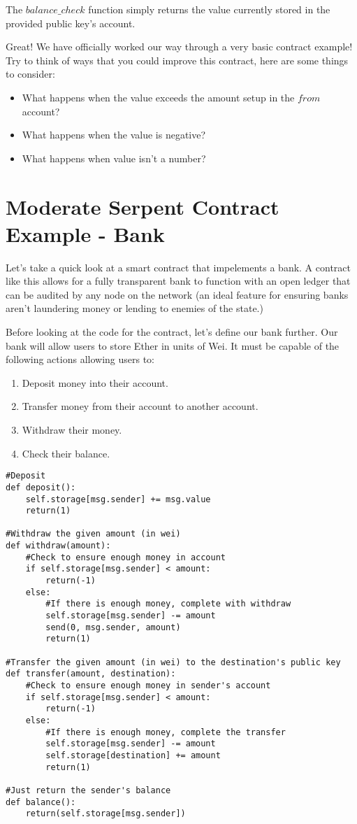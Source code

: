 \documentclass[12pt]{article}
\begin{document}
The $balance\_check$ function simply returns the value currently stored in the provided public key's account. 

Great! We have officially worked our way through a very basic contract example! Try to think of ways that you could improve this contract, here are some things to consider:

\begin{itemize}
\item What happens when the value exceeds the amount setup in the $from$ account?
\item What happens when the value is negative?
\item What happens when value isn't a number?
\end{itemize}

\cite{KenK'sFirstContractTutorial}

\section{Moderate Serpent Contract Example - Bank}

Let's take a quick look at a smart contract that impelements a bank. A contract like this allows for a fully transparent bank to function with an open ledger that can be audited by any node on the network (an ideal feature for ensuring banks aren't laundering money or lending to enemies of the state.)

Before looking at the code for the contract, let's define our bank further. Our bank will allow users to store Ether in units of Wei. It must be capable of the following actions allowing users to:
\begin{enumerate}
\item Deposit money into their account.
\item Transfer money from their account to another account.
\item Withdraw their money.
\item Check their balance.
\end{enumerate}

\begin{mdframed}
\begin{verbatim}
#Deposit
def deposit():
	self.storage[msg.sender] += msg.value
	return(1)

#Withdraw the given amount (in wei)
def withdraw(amount):
	#Check to ensure enough money in account
	if self.storage[msg.sender] < amount:
		return(-1)
	else:
		#If there is enough money, complete with withdraw
		self.storage[msg.sender] -= amount
		send(0, msg.sender, amount)
		return(1)

#Transfer the given amount (in wei) to the destination's public key
def transfer(amount, destination):
	#Check to ensure enough money in sender's account
	if self.storage[msg.sender] < amount:
		return(-1)
	else:
		#If there is enough money, complete the transfer
		self.storage[msg.sender] -= amount
		self.storage[destination] += amount
		return(1)

#Just return the sender's balance
def balance():
	return(self.storage[msg.sender])
\end{verbatim}
\end{mdframed}
		
\end{document}
